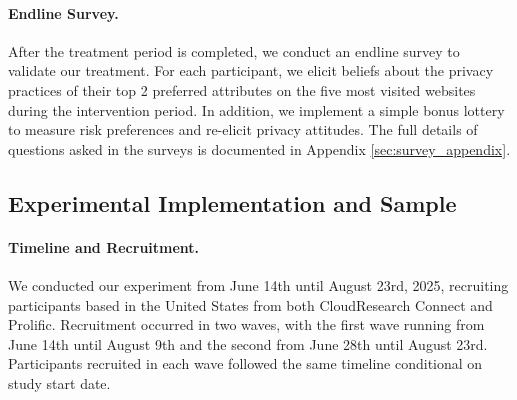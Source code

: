 \documentclass[12pt]{article}
\theoremstyle{definition}
\theoremstyle{remark}
\begin{document}
\paragraph{Endline Survey.} After the treatment period is completed, we conduct an endline survey to validate our treatment. For each participant, we elicit beliefs about the privacy practices of their top 2 preferred attributes on the five most visited websites during the intervention period. In addition, we implement a simple bonus lottery to measure risk preferences \citep{CHARNESS201343, RePEc:kap:jrisku:v:41:y:2010:i:3:p:219-243} and re-elicit privacy attitudes. The full details of questions asked in the surveys is documented in Appendix \ref{sec:survey_appendix}.

\subsection{Experimental Implementation and Sample}

\paragraph{Timeline and Recruitment.}  We conducted our experiment from June 14th until August 23rd, 2025, recruiting participants based in the United States from both CloudResearch Connect and Prolific. Recruitment occurred in two waves, with the first wave running from June 14th until August 9th and the second from June 28th until August 23rd. Participants recruited in each wave followed the same timeline conditional on study start date. 
\end{document}
